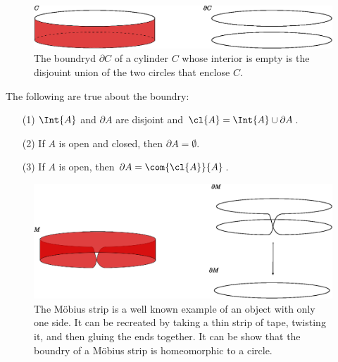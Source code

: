 \begin{figure}[h]
    \centering
    \includegraphics[scale=0.5]{Figures/Chapter1/boundry_cylinder.eps}
    \caption{The boundryd $\partial{C}$ of a cylinder $C$ whose interior is
    empty is the disjouint union of the two circles that enclose $C$.}
    \label{fig_1.9}
\end{figure}

\begin{example}\label{1.18}
    The following are true about the boundry:
    \begin{enumerate}
        \item[(1)] $\Int{A}$ and $\partial{A}$ are disjoint and $\cl{A}=\Int{A}
            \cup \partial{A}$.

        \item[(2)] If $A$ is open and closed, then $\partial{A}=\emptyset$.

        \item[(3)] If $A$ is open, then  $\partial{A}=\com{\cl{A}}{A}$.
    \end{enumerate}
\end{example}

\begin{figure}[h]
    \centering
    \includegraphics[scale=0.5]{Figures/Chapter1/boundry_mobius.eps}
    \caption{The M\"obius strip is a well known example of an object with only
    one side. It can be recreated by taking a thin strip of tape, twisting it,
    and then gluing the ends together. It can be show that the boundry of a
    M\"obius strip is homeomorphic to a circle.}
    \label{fig_1.9}
\end{figure}

